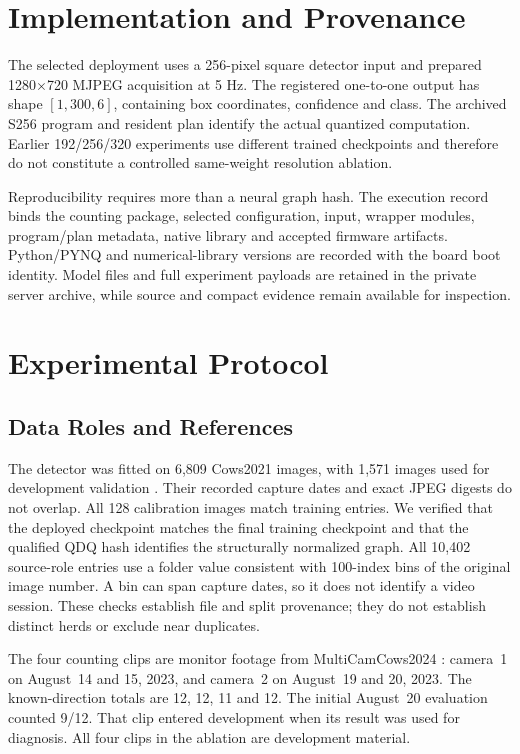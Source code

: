 \documentclass[journal]{IEEEtran}
\begin{document}
\section{Implementation and Provenance}
The selected deployment uses a 256-pixel square detector input and prepared 1280$\times$720 MJPEG acquisition at 5 Hz. The registered one-to-one output has shape $[1,300,6]$, containing box coordinates, confidence and class. The archived S256 program and resident plan identify the actual quantized computation. Earlier 192/256/320 experiments use different trained checkpoints and therefore do not constitute a controlled same-weight resolution ablation.

Reproducibility requires more than a neural graph hash. The execution record binds the counting package, selected configuration, input, wrapper modules, program/plan metadata, native library and accepted firmware artifacts. Python/PYNQ and numerical-library versions are recorded with the board boot identity. Model files and full experiment payloads are retained in the private server archive, while source and compact evidence remain available for inspection.

\section{Experimental Protocol}
\subsection{Data Roles and References}
The detector was fitted on 6,809 Cows2021 images, with 1,571 images used for development validation \cite{cows2021_data}. Their recorded capture dates and exact JPEG digests do not overlap. All 128 calibration images match training entries. We verified that the deployed checkpoint matches the final training checkpoint and that the qualified QDQ hash identifies the structurally normalized graph. All 10,402 source-role entries use a folder value consistent with 100-index bins of the original image number. A bin can span capture dates, so it does not identify a video session. These checks establish file and split provenance; they do not establish distinct herds or exclude near duplicates.

The four counting clips are monitor footage from MultiCamCows2024 \cite{multicamcows2024}: camera~1 on August~14 and 15, 2023, and camera~2 on August~19 and 20, 2023. The known-direction totals are 12, 12, 11 and 12. The initial August~20 evaluation counted 9/12. That clip entered development when its result was used for diagnosis. All four clips in the ablation are development material.
\end{document}
